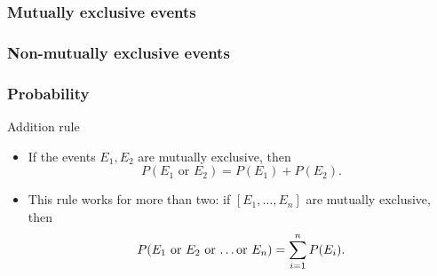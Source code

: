 \documentclass[handout]{beamer}
\begin{document}
   \begin{frame}
   \frametitle{Mutually exclusive events}
   \begin{center}
   \end{center}

   \end{frame}



   \begin{frame}
   \frametitle{Non-mutually exclusive events}
   \begin{center}
   \end{center}

   \end{frame}


   \begin{frame} \frametitle{Probability}

   \begin{block}
   {Addition rule}
   \begin{itemize}
   \item    If the events $E_1, E_2$ are mutually exclusive, then
   $$
   P(\text{$E_1$ or $E_2$}) = P(E_1) + P(E_2).
   $$
   \item This rule works for more than two: if $[E_1, \dots, E_n]$
     are mutually exclusive, then
   $$
   P(\text{$E_1$ or $E_2$ or \dots or $E_n$}) = \sum_{i=1}^n P(E_i).
   $$

   \end{itemize}
   \end{block}
   \end{frame}

\end{document}
